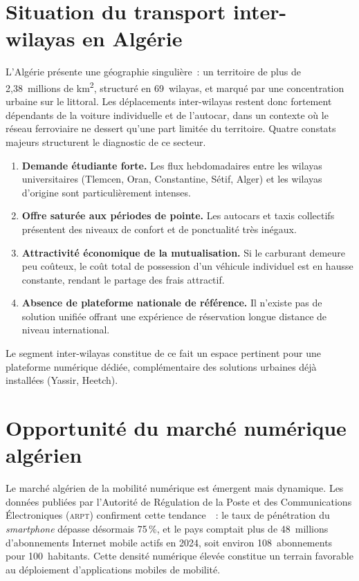 \section{Situation du transport inter-wilayas en Algérie}
\label{sec:transport-algerie}

L'Algérie présente une géographie singulière~: un territoire de plus de 2,38~millions de km\textsuperscript{2}, structuré en 69~wilayas, et marqué par une concentration urbaine sur le littoral. Les déplacements inter-wilayas restent donc fortement dépendants de la voiture individuelle et de l'autocar, dans un contexte où le réseau ferroviaire ne dessert qu'une part limitée du territoire. Quatre constats majeurs structurent le diagnostic de ce secteur.
\begin{enumerate}
  \item \textbf{Demande étudiante forte.} Les flux hebdomadaires entre les wilayas universitaires (Tlemcen, Oran, Constantine, Sétif, Alger) et les wilayas d'origine sont particulièrement intenses.
  \item \textbf{Offre saturée aux périodes de pointe.} Les autocars et taxis collectifs présentent des niveaux de confort et de ponctualité très inégaux.
  \item \textbf{Attractivité économique de la mutualisation.} Si le carburant demeure peu coûteux, le coût total de possession d'un véhicule individuel est en hausse constante, rendant le partage des frais attractif.
  \item \textbf{Absence de plateforme nationale de référence.} Il n'existe pas de solution unifiée offrant une expérience de réservation longue distance de niveau international.
\end{enumerate}

Le segment inter-wilayas constitue de ce fait un espace pertinent pour une plateforme numérique dédiée, complémentaire des solutions urbaines déjà installées (Yassir, Heetch).

\section{Opportunité du marché numérique algérien}
\label{sec:opportunite-marche}

Le marché algérien de la mobilité numérique est émergent mais dynamique. Les données publiées par l'Autorité de Régulation de la Poste et des Communications Électroniques (\textsc{arpt}) confirment cette tendance~\cite{arpt_2024}~: le taux de pénétration du \textit{smartphone} dépasse désormais 75\,\%, et le pays comptait plus de 48~millions d'abonnements Internet mobile actifs en 2024, soit environ 108~abonnements pour 100~habitants. Cette densité numérique élevée constitue un terrain favorable au déploiement d'applications mobiles de mobilité.

